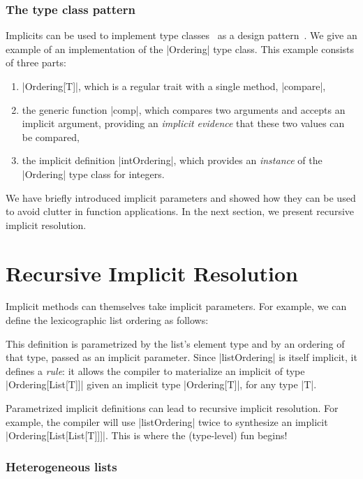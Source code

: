 \subsubsection{The type class pattern}

Implicits can be used to implement type classes~\citep{wadler1989how} as a design pattern~\citep{oliveira2010type}.
We give an example of an implementation of the |Ordering| type class.
This example consists of three parts:

\begin{enumerate}
  \item |Ordering[T]|, which is a regular trait with a single method, |compare|,
  \item the generic function |comp|, which compares two arguments and accepts an implicit argument, providing an \emph{implicit evidence} that these two values can be compared,
  \item the implicit definition |intOrdering|, which provides an \emph{instance} of the |Ordering| type class for integers.
\end{enumerate}

\ordExample

We have briefly introduced implicit parameters and showed how they can be used to avoid clutter in function applications.
In the next section, we present recursive implicit resolution.

\section{Recursive Implicit Resolution}
\label{sec:recursive-implicit-resolution}

Implicit methods can themselves take implicit parameters.
For example, we can define the lexicographic list ordering as follows:

\ordListExample

\noindent
This definition is parametrized by the list's element type and by an ordering of that type, passed as an implicit parameter.
Since |listOrdering| is itself implicit, it defines a \emph{rule}: it allows the compiler to materialize an implicit of type |Ordering[List[T]]| given an implicit type |Ordering[T]|, for any type |T|.

Parametrized implicit definitions can lead to recursive implicit resolution. For example, the compiler will use |listOrdering| twice to synthesize an implicit |Ordering[List[List[T]]]|.
This is where the (type-level) fun begins!

\subsubsection{Heterogeneous lists}


